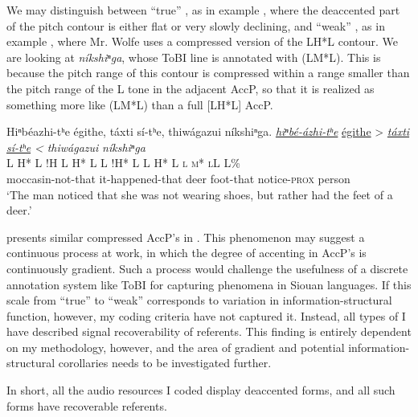 \documentclass[output=paper]{LSP/langsci}
\begin{document}
We may distinguish between “true” , as in example , where the deaccented part of the pitch contour is either flat or very slowly declining, and “weak” , as in example , where Mr. Wolfe uses a compressed version of the LH*L contour. We are looking at \textit{níkshiⁿga}, whose ToBI line is annotated with (LM*L). This is because the pitch range of this contour is compressed within a range smaller than the pitch range of the L tone in the adjacent AccP, so that it is realized as something more like (LM*L) than a full [LH*L] AccP.

\ea\label{wolfeweakdeaccenting}
Hiⁿbéazhi-tʰe égithe, táxti sí-tʰe, thiwágazui níkshiⁿga.\footnotemark
\glll	\emph{\underline{hiⁿbé-ázhi-tʰe}}	{\underline{égithe} >}				\emph{\underline{táxti}}		\emph{\underline{sí-tʰe} <}		\emph{thiwágazui}	\emph{níkshiⁿga}\\
	{\ob L H* L}				{\cb{}!H}	{\ob L H* L\cb}			{\ob L !H* L\cb}				{\ob L H* L}			{\op \textsc{l m* l}\cp\cb{}L L\%}\\
	moccasin-not-that			it-happened-that					deer					foot-that				notice-\textsc{prox}		person\\
\glt	`The man noticed that she was not wearing shoes, but rather had the feet of a deer.'
\z

\citet[121--123]{Mirzayan2011} presents similar compressed AccP’s in . This phenomenon may suggest a continuous process at work, in which the degree of accenting in AccP’s is continuously gradient. Such a process would challenge the usefulness of a discrete annotation system like ToBI for capturing  phenomena in Siouan languages. If this scale from “true” to “weak”  corresponds to variation in information-structural function, however, my coding criteria have not captured it. Instead, all types of  I have described signal recoverability of referents. This finding is entirely dependent on my methodology, however, and the area of gradient  and potential information-structural corollaries needs to be investigated further.

In short, all the audio resources I coded display deaccented forms, and all such forms have recoverable referents.
\end{document}
